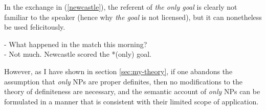 In the exchange in (\ref{newcastle}), the referent of \textit{the only goal} is clearly not familiar to the speaker (hence why \textit{the goal} is not licensed), but it can nonetheless be used felicitously.

\begin{exe}
	\ex \label{newcastle} - What happened in the match this morning? \\
	- Not much. Newcastle scored the *(only) goal.
\end{exe}

However, as I have shown in section \ref{sec:my-theory}, if one abandons the assumption that \textit{only} NPs are proper definites, then no modifications to the theory of definiteness are necessary, and the semantic account of \textit{only} NPs can be formulated in a manner that is consistent with their limited scope of application.